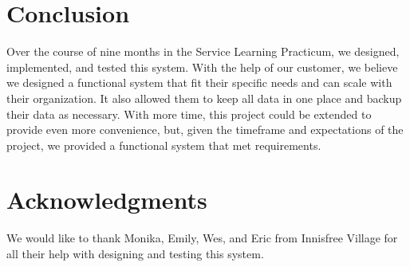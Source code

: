 \documentclass{sig-alternate}
\begin{document}
\section{Conclusion}
Over the course of nine months in the Service Learning Practicum, we designed, implemented, and tested this system.  With the help of our customer, we believe we designed a functional system that fit their specific needs and can scale with their organization.  It also allowed them to keep all data in one place and backup their data as necessary.  With more time, this project could be extended to provide even more convenience, but, given the timeframe and expectations of the project, we provided a functional system that met requirements.  

\section{Acknowledgments}
We would like to thank Monika, Emily, Wes, and Eric from Innisfree Village for all their help with designing and testing this system.
 

%

%
%
\end{document}
